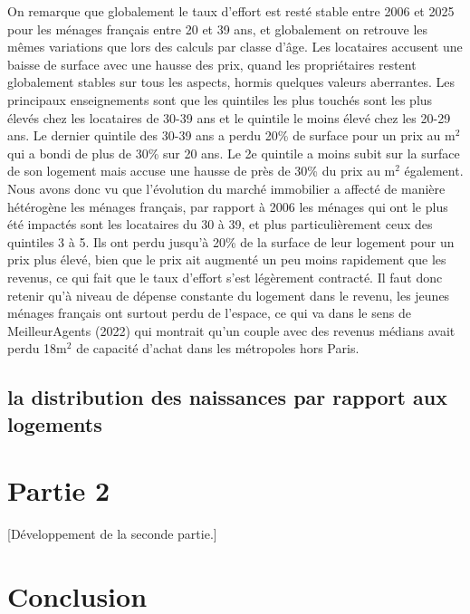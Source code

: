 \documentclass[12pt,a4paper]{article}
\begin{document}
\bigskip

\noindent On remarque que globalement le taux d'effort est resté stable entre 2006 et 2025 pour les ménages français entre 20 et 39 ans, et globalement on retrouve les mêmes variations que lors des calculs par classe d'âge. Les locataires accusent une baisse de surface avec une hausse des prix, quand les propriétaires restent globalement stables sur tous les aspects, hormis quelques valeurs aberrantes. Les principaux enseignements sont que les quintiles les plus touchés sont les plus élevés chez les locataires de 30-39 ans et le quintile le moins élevé chez les 20-29 ans. Le dernier quintile des 30-39 ans a perdu 20\% de surface pour un prix au m$^2$ qui a bondi de plus de 30\% sur 20 ans. Le 2e quintile a moins subit sur la surface de son logement mais accuse une hausse de près de 30\% du prix au m$^2$ également. \\

\noindent Nous avons donc vu que l'évolution du marché immobilier a affecté de manière hétérogène les ménages français, par rapport à 2006 les ménages qui ont le plus été impactés sont les locataires du 30 à 39, et plus particulièrement ceux des quintiles 3 à 5. Ils ont perdu jusqu'à 20\% de la surface de leur logement pour un prix plus élevé, bien que le prix ait augmenté un peu moins rapidement que les revenus, ce qui fait que le taux d'effort s'est légèrement contracté. Il faut donc retenir qu'à niveau de dépense constante du logement dans le revenu, les jeunes ménages français ont surtout perdu de l'espace, ce qui va dans le sens de MeilleurAgents (2022) qui montrait qu'un couple avec des revenus médians avait perdu 18m$^2$ de capacité d'achat dans les métropoles hors Paris.   

\subsection{la distribution des naissances par rapport aux logements}


\newpage
	
	\section{Partie 2}
	
	[Développement de la seconde partie.]
	
	\section{Conclusion}
	
\end{document}
